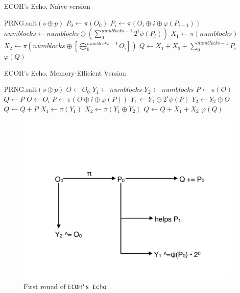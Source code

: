 \begin{Algorithm}
\caption{ECOH's Echo, Na\"ive version}
\label{alg:naive}
\begin{algorithmic}
        \State PRNG.salt$(s \oplus p)$
        \State $P_0 \gets \pi(O_0)$
            \State $P_i \gets \pi\left(O_i \oplus i \oplus
                \varphi(P_{i-1})\right)$
        \EndFor
        \State $numblocks \gets numblocks \oplus \left(\sum_0^{numblocks - 1}
            2^i\psi(P_i)\right)$
        \State $X_1 \gets \pi(numblocks)$
        \State $X_2 \gets \pi\left(numblocks \oplus
            \left[\bigoplus_0^{numblocks-1} O_i\right]\right)$
        \State $Q \gets X_1 + X_2 + \sum_0^{numblocks-1}P_i$
        \State \Return $\varphi(Q)$
    \EndFunction
\end{algorithmic}
\end{Algorithm}

\begin{Algorithm}
\caption{ECOH's Echo, Memory-Efficient Version}
\label{alg:good}
\begin{algorithmic}
        \State PRNG.salt$(s \oplus p)$
        \State $O \gets O_0$
        \State $Y_1 \gets numblocks$
        \State $Y_2 \gets numblocks$
        \State $P \gets \pi(O)$
        \State $Q \gets P$
            \State $O \gets O_i$
            \State $P \gets \pi\left(O \oplus i \oplus \varphi(P)\right)$
            \State $Y_1 \gets Y_1 \oplus 2^i\psi(P)$
            \State $Y_2 \gets Y_2 \oplus O$
            \State $Q \gets Q + P$
        \EndFor
        \State $X_1 \gets \pi(Y_1)$
        \State $X_2 \gets \pi\left(Y_1 \oplus Y_2\right)$
        \State $Q \gets Q + X_1 + X_2$
        \State \Return $\varphi(Q)$
    \EndFunction
\end{algorithmic}
\end{Algorithm}

\begin{figure}[htbp]
    \centering
    \includegraphics[scale=0.5]{figures/ecoh_echo.pdf}
    \caption{First round of \texttt{ECOH's Echo}}
    \label{fig:first_round}
\end{figure}

